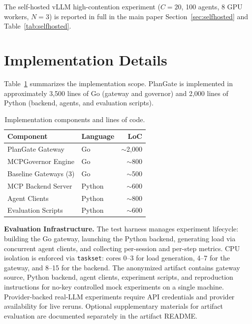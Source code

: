 \documentclass[sigconf,anonymous]{acmart}
\begin{document}
The self-hosted vLLM high-contention experiment ($C{=}20$, 100 agents, 8 GPU workers, $N{=}3$) is reported in full in the main paper Section~\ref{sec:selfhosted} and Table~\ref{tab:selfhosted}.


\section{Implementation Details}
\label{sec:impl_details}

Table~\ref{tab:impl} summarizes the implementation scope. PlanGate is implemented in approximately 3,500 lines of Go (gateway and governor) and 2,000 lines of Python (backend, agents, and evaluation scripts).

\begin{table}[h]
\caption{Implementation components and lines of code.}
\label{tab:impl}
\small
\begin{tabular}{@{}llr@{}}
\toprule
\textbf{Component} & \textbf{Language} & \textbf{LoC} \\
\midrule
PlanGate Gateway & Go & $\sim$2,000 \\
MCPGovernor Engine & Go & $\sim$800 \\
Baseline Gateways (3) & Go & $\sim$500 \\
MCP Backend Server & Python & $\sim$600 \\
Agent Clients & Python & $\sim$800 \\
Evaluation Scripts & Python & $\sim$600 \\
\bottomrule
\end{tabular}
\end{table}

\textbf{Evaluation Infrastructure.} The test harness manages experiment lifecycle: building the Go gateway, launching the Python backend, generating load via concurrent agent clients, and collecting per-session and per-step metrics. CPU isolation is enforced via \texttt{taskset}: cores 0--3 for load generation, 4--7 for the gateway, and 8--15 for the backend. The anonymized artifact contains gateway source, Python backend, agent clients, experiment scripts, and reproduction instructions for no-key controlled mock experiments on a single machine. Provider-backed real-LLM experiments require API credentials and provider availability for live reruns. Optional supplementary materials for artifact evaluation are documented separately in the artifact README.
\end{document}
